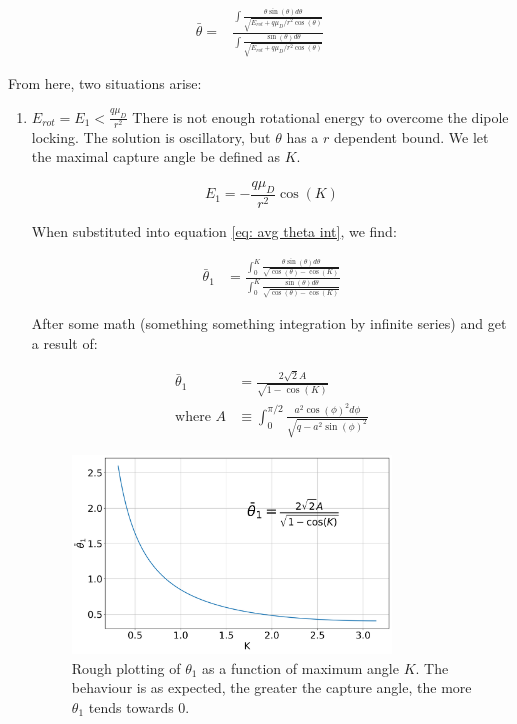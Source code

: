 \begin{align}
    \bar{\theta} = & \frac{\int\frac{\theta \sin(\theta)d\theta}{\sqrt{E_{rot}+q\mu_D/r^2 \cos(\theta)}}}{\int\frac{\sin(\theta)d\theta}{\sqrt{E_{rot}+q\mu_D/r^2 \cos(\theta)}}} \label{eq: avg theta int}
\end{align}

From here, two situations arise:

\begin{enumerate}
\item $E_{rot} = E_1 < \frac{q \mu_D}{r^2}$
There is not enough rotational energy to overcome the dipole locking. The solution is oscillatory, but $\theta$ has a $r$ dependent bound. We let the maximal capture angle be defined as $K$.

$$ E_1=-\frac{q \mu_D}{r^2}\cos(K) $$

When substituted into equation \ref{eq: avg theta int}, we find:

\begin{align*}
    \bar{\theta}_1 & = \frac{\int_0^K \frac{\theta \sin(\theta) d \theta}{\sqrt{\cos(\theta) - \cos(K)}}}{\int_0^K \frac{\sin(\theta) d \theta}{\sqrt{\cos(\theta) - \cos(K)}}}
\end{align*}


After some math (something something integration by infinite series) and get a result of:

\begin{align*}
    \bar{\theta}_1 & = \frac{2 \sqrt{2}A}{\sqrt{1-\cos(K)}} \\
    \text{where }A & \equiv \int_0^{\pi/2} \frac{a^2 \cos(\phi)^2 d\phi}{\sqrt{q-a^2 \sin(\phi)^2}}
\end{align*}

\begin{figure}[H]
\label{fig: theta1}
\centering
\includegraphics[width=0.8\textwidth]{images/ADO_theta1.png}
\caption{Rough plotting of $\theta_1$ as a function of maximum angle $K$. The behaviour is as expected, the greater the capture angle, the more $\theta_1$ tends towards 0.}
\end{figure}


\end{enumerate}
